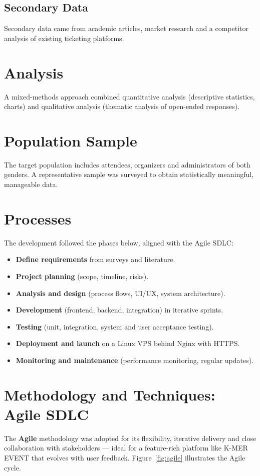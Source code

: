 \documentclass[12pt,a4paper]{report}
\begin{document}
\subsection{Secondary Data}
Secondary data came from academic articles, market research and a competitor analysis of
existing ticketing platforms.

\section{Analysis}
A mixed-methods approach combined quantitative analysis (descriptive statistics, charts) and
qualitative analysis (thematic analysis of open-ended responses).

\section{Population Sample}
The target population includes attendees, organizers and administrators of both genders. A
representative sample was surveyed to obtain statistically meaningful, manageable data.

\section{Processes}
The development followed the phases below, aligned with the Agile SDLC:
\begin{itemize}
  \item \textbf{Define requirements} from surveys and literature.
  \item \textbf{Project planning} (scope, timeline, risks).
  \item \textbf{Analysis and design} (process flows, UI/UX, system architecture).
  \item \textbf{Development} (frontend, backend, integration) in iterative sprints.
  \item \textbf{Testing} (unit, integration, system and user acceptance testing).
  \item \textbf{Deployment and launch} on a Linux VPS behind Nginx with HTTPS.
  \item \textbf{Monitoring and maintenance} (performance monitoring, regular updates).
\end{itemize}

\section{Methodology and Techniques: Agile SDLC}
The \textbf{Agile} methodology was adopted for its flexibility, iterative delivery and close
collaboration with stakeholders --- ideal for a feature-rich platform like K-MER EVENT that
evolves with user feedback. Figure~\ref{fig:agile} illustrates the Agile cycle.
\end{document}

